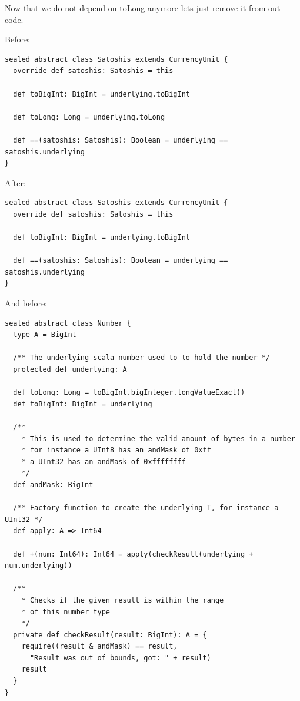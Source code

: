 \documentclass[runningheads]{llncs}
\begin{document}
Now that we do not depend on toLong anymore lets just remove it from out code.

Before:
\begin{lstlisting}[style=scala]
sealed abstract class Satoshis extends CurrencyUnit {
  override def satoshis: Satoshis = this

  def toBigInt: BigInt = underlying.toBigInt

  def toLong: Long = underlying.toLong

  def ==(satoshis: Satoshis): Boolean = underlying == satoshis.underlying
}  
\end{lstlisting}

After:
\begin{lstlisting}[style=scala]
sealed abstract class Satoshis extends CurrencyUnit {
  override def satoshis: Satoshis = this

  def toBigInt: BigInt = underlying.toBigInt

  def ==(satoshis: Satoshis): Boolean = underlying == satoshis.underlying
}  
\end{lstlisting}

And before:
\begin{lstlisting}[style=scala]
sealed abstract class Number {
  type A = BigInt

  /** The underlying scala number used to to hold the number */
  protected def underlying: A

  def toLong: Long = toBigInt.bigInteger.longValueExact()
  def toBigInt: BigInt = underlying

  /**
    * This is used to determine the valid amount of bytes in a number
    * for instance a UInt8 has an andMask of 0xff
    * a UInt32 has an andMask of 0xffffffff
    */
  def andMask: BigInt

  /** Factory function to create the underlying T, for instance a UInt32 */
  def apply: A => Int64

  def +(num: Int64): Int64 = apply(checkResult(underlying + num.underlying))

  /**
    * Checks if the given result is within the range
    * of this number type
    */
  private def checkResult(result: BigInt): A = {
    require((result & andMask) == result,
      "Result was out of bounds, got: " + result)
    result
  }
}  
\end{lstlisting}
\end{document}
